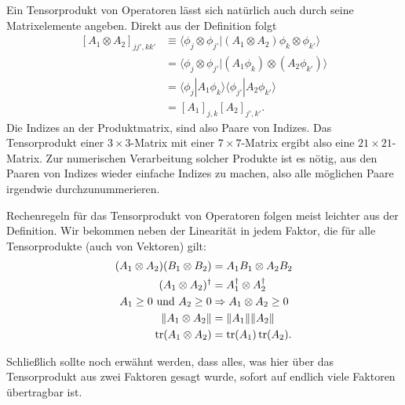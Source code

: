 Ein Tensorprodukt von Operatoren lässt sich natürlich auch durch seine Matrixelemente angeben. Direkt aus der Definition folgt
\begin{equation}
	\begin{split}
			[A_1\otimes A_2]_{jj',kk'} &\equiv \langle \phi_j\otimes \phi_{j'}|\left(A_1\otimes A_2\right) \phi_k\otimes\phi_{k'}\rangle \\
			&= \langle \phi_j\otimes \phi_{j'}| (A_1\phi_k)\otimes (A_2\phi_{k'})\rangle \\
			&= \langle \phi_j|A_1\phi_k\rangle \langle \phi_{j'}|A_2\phi_{k'}\rangle \\
			&= [A_1]_{j,k}[A_2]_{j',k'}.
	\end{split}
\end{equation}
Die Indizes an der Produktmatrix, sind also Paare von Indizes. Das Tensorprodukt einer $3\times 3$-Matrix mit einer $7\times 7$-Matrix ergibt also eine $21\times 21$-Matrix. Zur numerischen Verarbeitung solcher Produkte ist es nötig, aus den Paaren von Indizes wieder einfache Indizes zu machen, also alle möglichen Paare irgendwie durchzunummerieren.

Rechenregeln für das Tensorprodukt von Operatoren folgen meist leichter aus der Definition. Wir bekommen neben der Linearität in jedem Faktor, die für alle Tensorprodukte (auch von Vektoren) gilt:
\begin{align}
	(A_1\otimes A_2)(B_1\otimes B_2) &= A_1B_1\otimes A_2B_2 \\
	(A_1\otimes A_2)^\dag &= A_1^\dag \otimes A_2^\dag \\
	\text{$A_1\ge 0$ und $A_2\ge 0$} &\Rightarrow A_1\otimes A_2 \ge 0 \\
	\|A_1\otimes A_2\| &= \|A_1\|\| A_2\| \\
	\operatorname{tr}(A_1\otimes A_2) &= \operatorname{tr}(A_1)\operatorname{tr}(A_2).
\end{align}

Schließlich sollte noch erwähnt werden, dass alles, was hier über das Tensorprodukt aus zwei Faktoren gesagt wurde, sofort auf endlich viele Faktoren übertragbar ist.